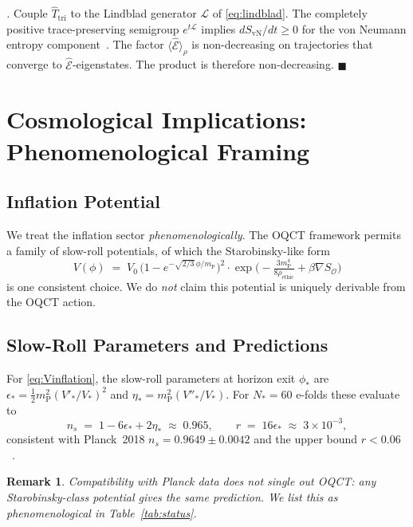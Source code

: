\documentclass[11pt,a4paper]{article}
\theoremstyle{myrmk}
\newtheorem{remark}{Remark}[section]
\renewenvironment{proof}[1][\proofname]{%
  \par\noindent\textit{#1.}\enspace\ignorespaces}{\hfill$\blacksquare$\par\medskip}
\newcommand{\SO}{\nabla S_{\!\mathcal{O}}}
\newcommand{\mP}{m_{\mathrm{P}}}
\newcommand{\Ehat}{\hat{\mathcal{E}}}
\begin{document}
\begin{proof}
Couple $\hat T_{\mathrm{tri}}$ to the Lindblad generator $\mathcal{L}$ of
\eqref{eq:lindblad}. The completely positive trace-preserving semigroup
$e^{t\mathcal{L}}$ implies $dS_{\mathrm{vN}}/dt\geq 0$ for the von Neumann entropy
component~\cite{Spohn1978}. The factor $\langle\Ehat\rangle_\rho$ is non-decreasing on
trajectories that converge to $\Ehat$-eigenstates. The product is therefore
non-decreasing.
\end{proof}

\section{Cosmological Implications: Phenomenological Framing}
\label{sec:inflation}

\subsection{Inflation Potential}

We treat the inflation sector \emph{phenomenologically}. The OQCT framework permits a
family of slow-roll potentials, of which the Starobinsky-like form
\begin{equation}
  V(\phi) \;=\; V_0\,\bigl(1-e^{-\sqrt{2/3}\,\phi/\mP}\bigr)^{2}
   \cdot \exp\!\bigl(-\tfrac{3\mP^4}{8\rho_{\mathrm{ethic}}}+\beta\SO\bigr)
  \label{eq:Vinflation}
\end{equation}
is one consistent choice. We do \emph{not} claim this potential is uniquely derivable
from the OQCT action.

\subsection{Slow-Roll Parameters and Predictions}

For \eqref{eq:Vinflation}, the slow-roll parameters at horizon exit $\phi_*$ are
$\epsilon_*=\tfrac{1}{2}\mP^2(V'_*/V_*)^{2}$ and $\eta_*=\mP^2(V''_*/V_*)$.
For $N_*=60$ e-folds these evaluate to
\begin{equation}
  n_s \;=\; 1-6\epsilon_*+2\eta_* \;\approx\; 0.965,
  \qquad
  r \;=\; 16\epsilon_* \;\approx\; 3\times 10^{-3},
\end{equation}
consistent with Planck~2018 $n_s=0.9649\pm 0.0042$ and the upper bound
$r<0.06$~\cite{Planck2018}.

\begin{remark}
Compatibility with Planck data does not single out OQCT: any Starobinsky-class
potential gives the same prediction. We list this as \emph{phenomenological} in
Table~\ref{tab:status}.
\end{remark}
\end{document}
